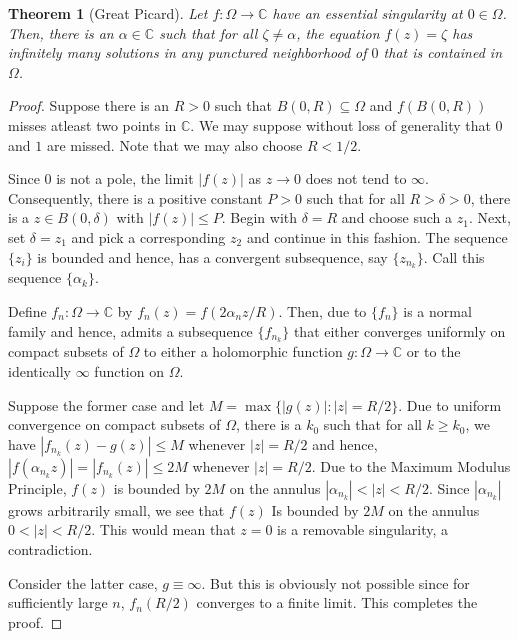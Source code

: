 \documentclass[12pt]{article}
\theoremstyle{thmstyle}
\newtheorem{theorem}{Theorem}[section]
\theoremstyle{defstyle}
\newcommand{\bbC}{\mathbb{C}}
\renewcommand{\le}{\leqslant}
\renewcommand{\ge}{\geqslant}
\begin{document}
\begin{theorem}[Great Picard]
    Let $f:\Omega\to\bbC$ have an essential singularity at $0\in\Omega$. Then, there is an $\alpha\in\bbC$ such that for all $\zeta\ne\alpha$, the equation $f(z) = \zeta$ has infinitely many solutions in any punctured neighborhood of $0$ that is contained in $\Omega$.
\end{theorem}
\begin{proof}
    Suppose there is an $R > 0$ such that $B(0,R)\subseteq\Omega$ and $f(B(0, R))$ misses atleast two points in $\bbC$. We may suppose without loss of generality that $0$ and $1$ are missed. Note that we may also choose $R < 1/2$.

    Since $0$ is not a pole, the limit $|f(z)|$ as $z\to 0$ does not tend to $\infty$. Consequently, there is a positive constant $P > 0$ such that for all $R > \delta > 0$, there is a $z\in B(0,\delta)$ with $|f(z)|\le P$. Begin with $\delta = R$ and choose such a $z_1$. Next, set $\delta = z_1$ and pick a corresponding $z_2$ and continue in this fashion. The sequence $\{z_i\}$ is bounded and hence, has a convergent subsequence, say $\{z_{n_k}\}$. Call this sequence $\{\alpha_k\}$.
    
    Define $f_n:\Omega\to\bbC$ by $f_n(z) = f(2\alpha_n z/R)$. Then, due to  $\{f_n\}$ is a normal family and hence, admits a subsequence $\{f_{n_k}\}$ that either converges uniformly on compact subsets of $\Omega$ to either a holomorphic function $g:\Omega\to\bbC$ or to the identically $\infty$ function on $\Omega$.

    Suppose the former case and let $M = \max\{|g(z)|\colon |z| = R/2\}$. Due to uniform convergence on compact subsets of $\Omega$, there is a $k_0$ such that for all $k\ge k_0$, we have $|f_{n_k}(z) - g(z)|\le M$ whenever $|z| = R/2$ and hence, $|f(\alpha_{n_k} z)| = |f_{n_k}(z)|\le 2M$ whenever $|z| = R/2$. Due to the Maximum Modulus Principle, $f(z)$ is bounded by $2M$ on the annulus $|\alpha_{n_k}| < |z| < R/2$. Since $|\alpha_{n_k}|$ grows arbitrarily small, we see that $f(z)$ Is bounded by $2M$ on the annulus $0 < |z| < R/2$. This would mean that $z = 0$ is a removable singularity, a contradiction.

    Consider the latter case, $g\equiv\infty$. But this is obviously not possible since for sufficiently large $n$, $f_n(R/2)$ converges to a finite limit. This completes the proof.
\end{proof}
\end{document}

